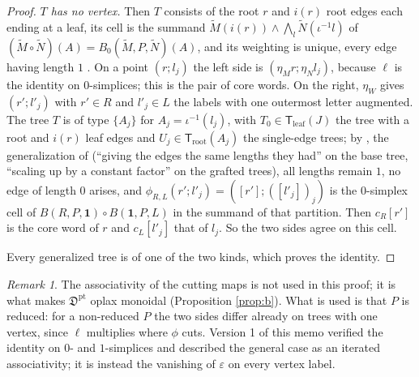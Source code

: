 \documentclass[11pt]{amsart}
\theoremstyle{definition}
\theoremstyle{remark}
\newtheorem{remark}[subsection]{Remark}
\newcommand{\unit}{\mathbf{1}}
\newcommand{\Fptpt}{\mathfrak{D}^{\mathrm{pt}}}
\begin{document}
\begin{proof}
\emph{$T$ has no vertex.} Then $T$ consists of the root $r$ and $i(r)$ root edges each ending at a leaf, its cell is the summand $\widetilde M(i(r))\wedge\bigwedge_l\widetilde N(\iota^{-1}l)$ of $(\widetilde M\circ\widetilde N)(A)=B_0(\widetilde M,P,\widetilde N)(A)$, and its weighting is unique, every edge having length $1$ \cite[Definition 7.4]{Ch05}. On a point $(r;l_j)$ the left side is $(\eta_M r;\eta_N l_j)$, because $\ell$ is the identity on $0$-simplices; this is the pair of core words. On the right, $\eta_W$ gives $(r';l'_j)$ with $r'\in R$ and $l'_j\in L$ the labels with one outermost letter augmented. The tree $T$ is of type $\{A_j\}$ for $A_j=\iota^{-1}(l_j)$, with $T_0\in\mathsf T_{\mathrm{leaf}}(J)$ the tree with a root and $i(r)$ leaf edges and $U_j\in\mathsf T_{\mathrm{root}}(A_j)$ the single-edge trees; by \cite[Definition 7.24]{Ch05}, the generalization of \cite[Definition 4.16]{Ch05} (``giving the edges the same lengths they had'' on the base tree, ``scaling up by a constant factor'' on the grafted trees), all lengths remain $1$, no edge of length $0$ arises, and $\phi_{R,L}(r';l'_j)=([r'];([l'_j])_j)$ is the $0$-simplex cell of $B(R,P,\unit)\circ B(\unit,P,L)$ in the summand of that partition. Then $c_R[r']$ is the core word of $r$ and $c_L[l'_j]$ that of $l_j$. So the two sides agree on this cell.

Every generalized tree is of one of the two kinds, which proves the identity.
\end{proof}

\begin{remark}
The associativity of the cutting maps \cite[Proposition 7.15]{AC1} is not used in this proof; it is what makes $\Fptpt$ oplax monoidal (Proposition \ref{prop:b}). What is used is that $P$ is reduced: for a non-reduced $P$ the two sides differ already on trees with one vertex, since $\ell$ multiplies where $\phi$ cuts. Version 1 of this memo verified the identity on $0$- and $1$-simplices and described the general case as an iterated associativity; it is instead the vanishing of $\varepsilon$ on every vertex label.
\end{remark}
\end{document}
